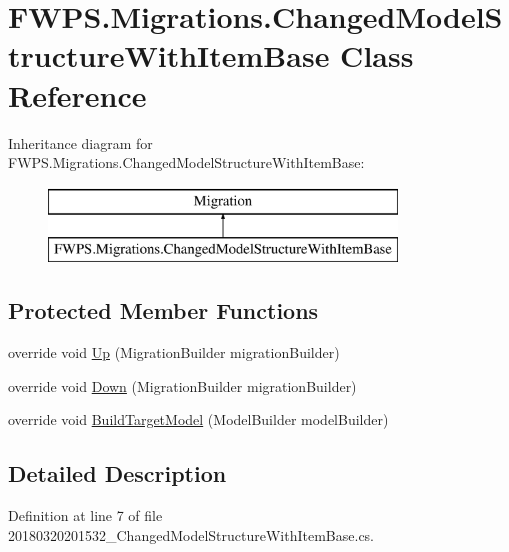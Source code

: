 \hypertarget{class_f_w_p_s_1_1_migrations_1_1_changed_model_structure_with_item_base}{}\section{F\+W\+P\+S.\+Migrations.\+Changed\+Model\+Structure\+With\+Item\+Base Class Reference}
\label{class_f_w_p_s_1_1_migrations_1_1_changed_model_structure_with_item_base}
Inheritance diagram for F\+W\+P\+S.\+Migrations.\+Changed\+Model\+Structure\+With\+Item\+Base\+:\begin{figure}[H]
\begin{center}
\leavevmode
\includegraphics[height=2.000000cm]{class_f_w_p_s_1_1_migrations_1_1_changed_model_structure_with_item_base}
\end{center}
\end{figure}
\subsection*{Protected Member Functions}
\begin{DoxyCompactItemize}
\item 
override void \mbox{\hyperlink{class_f_w_p_s_1_1_migrations_1_1_changed_model_structure_with_item_base_ac9fc1354c61774fbf43f81f98570dd77}{Up}} (Migration\+Builder migration\+Builder)
\item 
override void \mbox{\hyperlink{class_f_w_p_s_1_1_migrations_1_1_changed_model_structure_with_item_base_a93e9e8dadbbd7ea7345b641a9ddd8b9a}{Down}} (Migration\+Builder migration\+Builder)
\item 
override void \mbox{\hyperlink{class_f_w_p_s_1_1_migrations_1_1_changed_model_structure_with_item_base_a87ec44baff073db094b29d5da357651c}{Build\+Target\+Model}} (Model\+Builder model\+Builder)
\end{DoxyCompactItemize}


\subsection{Detailed Description}


Definition at line 7 of file 20180320201532\+\_\+\+Changed\+Model\+Structure\+With\+Item\+Base.\+cs.



